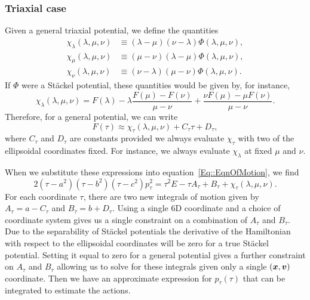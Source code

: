 \documentclass[useAMS,usenatbib,fleqn,a4paper]{mn2e}
\newcommand{\bs}[1]{\bmath{#1}}
\begin{document}
\subsubsection{Triaxial case}\label{Method::SF_Triax}

Given a general triaxial potential, we define the quantities
\begin{equation}
\begin{split}
\chi_\lambda(\lambda,\mu,\nu) &\equiv (\lambda-\mu)(\nu-\lambda)\Phi(\lambda,\mu,\nu),\\
\chi_\mu(\lambda,\mu,\nu) &\equiv (\mu-\nu)(\lambda-\mu)\Phi(\lambda,\mu,\nu),\\
\chi_\nu(\lambda,\mu,\nu) &\equiv (\nu-\lambda)(\mu-\nu)\Phi(\lambda,\mu,\nu).
\end{split}
\end{equation}
If $\Phi$ were a St\"ackel potential, these quantities would be given by, for instance,
\begin{equation}
\chi_\lambda(\lambda,\mu,\nu) = F(\lambda)-\lambda\frac{F(\mu)-F(\nu)}{\mu-\nu}+\frac{\nu F(\mu)-\mu F(\nu)}{\mu-\nu}.
\end{equation}
Therefore, for a general potential, we can write
\begin{equation}
F(\tau) \approx \chi_\tau(\lambda,\mu,\nu)+C_\tau\tau+D_\tau,
\end{equation}
where $C_\tau$ and $D_\tau$ are constants provided we always evaluate
$\chi_\tau$ with two of the ellipsoidal coordinates fixed. For instance, we
always evaluate $\chi_\lambda$ at fixed $\mu$ and $\nu$.

When we substitute these expressions into equation~\eqref{Eq::EqnOfMotion}, we find
\begin{equation}
2(\tau-a^2)(\tau-b^2)(\tau-c^2)p_\tau^2=\tau^2 E -\tau A_\tau+B_\tau +\chi_\tau(\lambda,\mu,\nu).
\label{Eq::EqnOfMotion_JK}
\end{equation}
For each coordinate $\tau$, there are two new integrals of motion given by
$A_\tau=a-C_\tau$ and $B_\tau=b+D_\tau$. Using a single 6D coordinate and a
choice of coordinate system gives us a single constraint on a combination of
$A_\tau$ and $B_\tau$. Due to the separability of St\"ackel potentials the
derivative of the Hamiltonian with respect to the ellipsoidal coordinates
will be zero for a true St\"ackel potential. Setting it equal to zero for a
general potential gives a further constraint on $A_\tau$ and $B_\tau$ allowing
us to solve for these integrals given only a single $(\bs{x},\bs{v})$
coordinate. Then we have an approximate expression for $p_\tau(\tau)$ that
can be integrated to estimate the actions.
\end{document}
